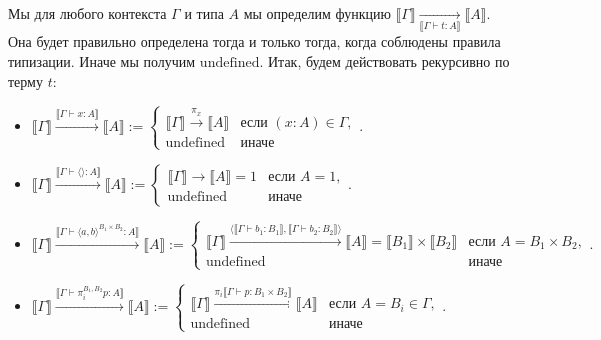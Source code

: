 \documentclass[openany]{book}
\theoremstyle{plain}
\theoremstyle{definition}
\begin{document}
Мы для любого контекста \(\Gamma\) и типа \(A\) мы определим функцию \(\llbracket \Gamma \rrbracket \underset{\llbracket \Gamma \vdash t : A \rrbracket}{\to} \llbracket A \rrbracket\). Она будет правильно определена тогда и только тогда, когда соблюдены правила типизации. Иначе мы получим \(\mathrm{undefined}\). Итак, будем действовать рекурсивно по терму \(t\):
\begin{itemize}
    \item \(\llbracket \Gamma \rrbracket \overset{\llbracket \Gamma \vdash x : A \rrbracket}{\longrightarrow} \llbracket A \rrbracket := \begin{cases}\llbracket \Gamma \rrbracket \overset{\pi_x}{\longrightarrow} \llbracket A \rrbracket & \text{если }(x:A) \in \Gamma,\\ \text{undefined} & \text{иначе}\end{cases}.\)

    \item \(\llbracket \Gamma \rrbracket \overset{\llbracket \Gamma \vdash \langle \rangle : A \rrbracket}{\longrightarrow} \llbracket A \rrbracket := \begin{cases}\llbracket \Gamma \rrbracket \overset{}{\longrightarrow} \llbracket A \rrbracket = 1 & \text{если }A=1,\\ \text{undefined} & \text{иначе}\end{cases}.\)

    \item \(\llbracket \Gamma \rrbracket \overset{\llbracket \Gamma \vdash \langle a, b \rangle^{B_1 \times B_2} : A \rrbracket}{\longrightarrow} \llbracket A \rrbracket := \begin{cases}\llbracket \Gamma \rrbracket \overset{\langle \llbracket \Gamma \vdash b_1 : B_1 \rrbracket, \llbracket \Gamma \vdash b_2 : B_2 \rrbracket \rangle}{\longrightarrow} \llbracket A \rrbracket = \llbracket B_1 \rrbracket \times \llbracket B_2 \rrbracket & \text{если }A=B_1 \times B_2,\\ \text{undefined} & \text{иначе}\end{cases}.\)

    \item \(\llbracket \Gamma \rrbracket \overset{\llbracket \Gamma \vdash \pi_i^{B_1, B_2} p : A \rrbracket}{\longrightarrow} \llbracket A \rrbracket := \begin{cases}\llbracket \Gamma \rrbracket \overset{\pi_i \llbracket \Gamma \vdash p : B_1 \times B_2 \rrbracket}{\longrightarrow} \llbracket A \rrbracket & \text{если }A = B_i \in \Gamma,\\ \text{undefined} & \text{иначе}\end{cases}.\)


\end{itemize}
\end{document}
